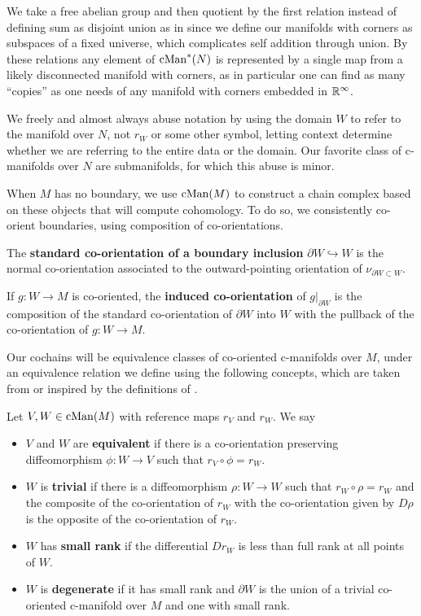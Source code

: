 We take a free abelian group and then quotient by the first relation instead of defining sum as disjoint union as in \cite{Lipy14} since we define our manifolds with corners as subspaces of a fixed universe, which complicates self addition through union.
By these relations any element of $\mathrm{cMan}^*(N)$ is represented by a single map from a likely disconnected manifold with corners, as in particular one can find as many ``copies'' as one needs of any manifold with corners embedded in $\mathbb{R}^\infty$.

We freely and almost always abuse notation by using the domain $W$ to refer to the manifold over $N$, not $r_W$ or some other symbol, letting context determine whether we are referring to the entire data or the domain.
Our favorite class of c-manifolds over $N$ are submanifolds, for which this abuse is minor.

When $M$ has no boundary, we use $\mathrm{cMan}(M)$ to construct a chain complex based on these objects that will compute cohomology.
To do so, we consistently co-orient boundaries, using composition of co-orientations.

\begin{definition}\label{D: boundary co-orientation}
	The {\bf standard co-orientation of a boundary inclusion} $\partial W \hookrightarrow W$ is the normal co-orientation associated to the outward-pointing orientation of $\nu_{\partial W \subset W}$.

	If $g \colon W \to M$ is co-oriented, the {\bf induced co-orientation} of $g|_{\partial W}$ is the composition of the standard co-orientation of $\partial W$ into $W$ with the pullback of the co-orientation of $g \colon W \to M$.
\end{definition}

Our cochains will be equivalence classes of co-oriented c-manifolds over $M$, under an equivalence relation we define using the following concepts, which are taken from or inspired by the definitions of \cite{Lipy14}.

\begin{definition}\label{D: cman types}
	Let $V, W\in \mathrm{cMan}(M)$ with reference maps $r_V$ and $r_W$.
	We say
	\begin{itemize}
		\item $V$ and $W$ are \textbf{equivalent} if there is a co-orientation preserving diffeomorphism $\phi \colon W \to V$ such that $r_V \circ \phi = r_W$.
		\item $W$ is \textbf{trivial} if there is a diffeomorphism $\rho \colon W \to W$ such that $r_W \circ \rho = r_W$
		and the composite of the co-orientation of $r_W$ with the co-orientation given by $D\rho$ is the opposite of the co-orientation of $r_W$.
		\item $W$ has \textbf{small rank} if the differential $D r_W$ is less than full rank at all points of $W$.
		\item $W$ is \textbf{degenerate} if it has small rank and ${\partial W}$ is the union of a trivial co-oriented
		c-manifold over $M$ and one with small rank.
	\end{itemize}
\end{definition}

